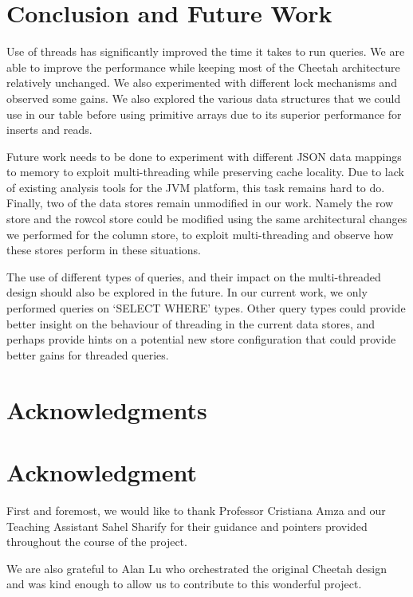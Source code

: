 \documentclass[11pt,journal,compsoc]{IEEEtran}
\begin{document}
\section{Conclusion and Future Work}
Use of threads has significantly improved the time it takes to run queries. We are able to improve the performance while keeping most of the Cheetah architecture relatively unchanged. We also experimented with different lock mechanisms and observed some gains. We also explored the various data structures that we could use in our table before using primitive arrays due to its superior performance for inserts and reads.

Future work needs to be done to experiment with different JSON data mappings to memory to exploit multi-threading while preserving cache locality. Due to lack of existing analysis tools for the JVM platform, this task remains hard to do.  Finally, two of the data stores remain unmodified in our work. Namely the row store and the rowcol store could be modified using the same architectural changes we performed for the column store, to exploit multi-threading and observe how these stores perform in these situations.

The use of different types of queries, and their impact on the multi-threaded design should also be explored in the future. In our current work, we only performed queries on ‘SELECT WHERE’ types. Other query types could provide better insight on the behaviour of threading in the current data stores, and perhaps provide hints on a potential new store configuration that could provide better gains for threaded queries. 


\ifCLASSOPTIONcompsoc
  \section*{Acknowledgments}
\else
  \section*{Acknowledgment}
\fi

First and foremost, we would like to thank Professor Cristiana Amza and our Teaching Assistant Sahel Sharify for their guidance and pointers provided throughout the course of the project. 


We are also grateful to Alan Lu  who orchestrated the original Cheetah design and was kind enough to allow us to contribute to this wonderful project.
\end{document}
